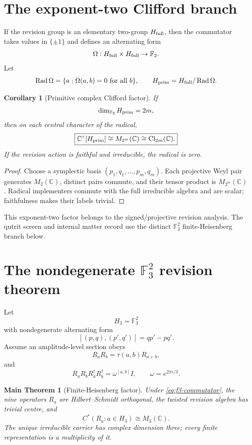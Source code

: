 \documentclass[11pt,oneside,openany]{book}
\numberwithin{equation}{chapter}
\newtheorem{corollary}[theorem]{Corollary}
\newtheorem{maintheorem}[theorem]{Main Theorem}
\theoremstyle{definition}
\theoremstyle{remark}
\newcommand{\C}{\mathbb C}
\begin{document}
\section{The exponent-two Clifford branch}

If the revision group is an elementary two-group \(H_{\rm full}\), then the
commutator takes values in \(\{\pm1\}\) and defines an alternating form
\[
 \Omega:H_{\rm full}\times H_{\rm full}\to\mathbb F_2.
\]
Let
\[
 \operatorname{Rad}\Omega
 =
 \{a:\Omega(a,b)=0\text{ for all }b\},
 \qquad
 H_{\rm prim}=H_{\rm full}/\operatorname{Rad}\Omega.
\]

\begin{corollary}[Primitive complex Clifford factor]
\label{cor:primitive-clifford}
If
\[
 \dim_{\mathbb F_2}H_{\rm prim}=2m,
\]
then on each central character of the radical,
\[
 \boxed{
 \C^\tau[H_{\rm prim}]
 \cong
 M_{2^m}(\C)
 \cong
 \operatorname{Cl}_{2m}(\C).}
\]
If the revision action is faithful and irreducible, the radical is zero.
\end{corollary}

\begin{proof}
Choose a symplectic basis
\((p_1,q_1,\ldots,p_m,q_m)\).  Each projective Weyl pair generates
\(M_2(\C)\), distinct pairs commute, and their tensor product is
\(M_{2^m}(\C)\).  Radical implementers commute with the full irreducible
algebra and are scalar; faithfulness makes their labels trivial.
\end{proof}

This exponent-two factor belongs to the signed/projective revision analysis.
The qutrit screen and internal matter record use the distinct
\(\mathbb F_3^2\) finite-Heisenberg branch below.

\section{The nondegenerate \texorpdfstring{\(\mathbb F_3^2\)}{F3 x F3} revision theorem}

Let
\[
 H_3=\mathbb F_3^2
\]
with nondegenerate alternating form
\[
 [(p,q),(p',q')]=qp'-pq'.
\]
Assume an amplitude-level section obeys
\[
 R_aR_b=\tau(a,b)R_{a+b},
\]
and
\[
 \boxed{
 R_aR_bR_a^\dagger R_b^\dagger
 =
 \omega^{[a,b]}I,
 \qquad
 \omega=e^{2\pi i/3}.}
 \label{eq:f3-commutator}
\]

\begin{maintheorem}[Finite-Heisenberg factor]
\label{thm:f3-heisenberg-factor}
Under \eqref{eq:f3-commutator}, the nine operators \(R_a\) are
Hilbert--Schmidt orthogonal, the twisted revision algebra has trivial centre,
and
\[
 \boxed{
 C^*(R_a:a\in H_3)\cong M_3(\C).}
\]
The unique irreducible carrier has complex dimension three; every finite
representation is a multiplicity of it.
\end{maintheorem}
\end{document}
